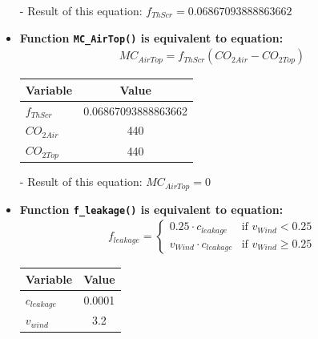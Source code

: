 \documentclass[a4paper]{article}
\numberwithin{equation}{section}
\begin{document}
\begin{itemize}
  \item[-] Result of this equation: \(f_{ThScr} = 0.06867093888863662\)

  \item \textbf{Function \texttt{MC\_AirTop()} is equivalent to equation:}
        \begin{align*}
          MC_{AirTop} = f_{ThScr} (CO_{2 Air} - CO_{2 Top})
        \end{align*}

        \begin{table}[H]
          \centering
          \begin{tabular}{@{}lS[table-format=3.16]@{}}
            \toprule
            \textbf{Variable} & \textbf{Value}      \\
            \midrule
            \(f_{ThScr}\)     & 0.06867093888863662 \\
            \(CO_{2 Air}\)    & 440                 \\
            \(CO_{2 Top}\)    & 440                 \\
            \bottomrule
          \end{tabular}
        \end{table}

  \item[-] Result of this equation: \(MC_{AirTop} = 0\)

  \item \textbf{Function \texttt{f\_leakage()} is equivalent to equation:}
        \begin{align*}
          f_{leakage} = \begin{cases}
            0.25 \cdot c_{leakage}     & \text{if~} v_{Wind} < 0.25    \\
            v_{Wind} \cdot c_{leakage} & \text{if~} v_{Wind} \geq 0.25
          \end{cases}
        \end{align*}

        \begin{table}[H]
          \centering
          \begin{tabular}{@{}lS[table-format=1.4]@{}}
            \toprule
            \textbf{Variable} & \textbf{Value} \\
            \midrule
            \(c_{leakage}\)   & 0.0001         \\
            \(v_{wind}\)      & 3.2            \\
            \bottomrule
          \end{tabular}
        \end{table}


\end{itemize}
\end{document}
